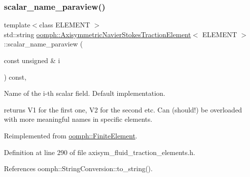 \mbox{\label{classoomph_1_1AxisymmetricNavierStokesTractionElement_a4ca57102287a03de1ee8c4f7f9ef1072}} 
\subsubsection{\texorpdfstring{scalar\+\_\+name\+\_\+paraview()}{scalar\_name\_paraview()}}
{\footnotesize\ttfamily template$<$class E\+L\+E\+M\+E\+NT $>$ \\
std\+::string \hyperlink{classoomph_1_1AxisymmetricNavierStokesTractionElement}{oomph\+::\+Axisymmetric\+Navier\+Stokes\+Traction\+Element}$<$ E\+L\+E\+M\+E\+NT $>$\+::scalar\+\_\+name\+\_\+paraview (\begin{DoxyParamCaption}\item[{const unsigned \&}]{i }\end{DoxyParamCaption}) const\hspace{0.3cm}{\ttfamily [inline]}, {\ttfamily [virtual]}}



Name of the i-\/th scalar field. Default implementation. 

returns V1 for the first one, V2 for the second etc. Can (should!) be overloaded with more meaningful names in specific elements. 

Reimplemented from \hyperlink{classoomph_1_1FiniteElement_a49cc2d4f7ed5772bbc96f06760372b51}{oomph\+::\+Finite\+Element}.



Definition at line 290 of file axisym\+\_\+fluid\+\_\+traction\+\_\+elements.\+h.



References oomph\+::\+String\+Conversion\+::to\+\_\+string().

\mbox{\label{classoomph_1_1AxisymmetricNavierStokesTractionElement_a0d4062b2db66d2a14eaa9c270eb034d6}} 
